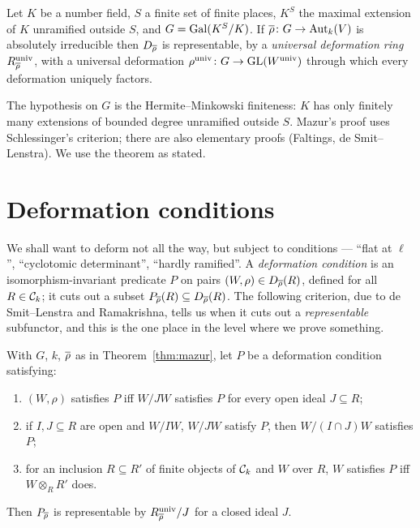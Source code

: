 \documentclass[11pt]{article}
\begin{document}
\begin{theorem}[Mazur, 1989]\label{thm:mazur}
Let $K$ be a number field, $S$ a finite set of finite places, $K^S$ the maximal
extension of $K$ unramified outside $S$, and $G=\operatorname{Gal}(K^S/K)$. If
$\overline{\rho}\colon G\to\operatorname{Aut}_k(V)$ is absolutely irreducible then $D_{\overline{\rho}}$ is
representable, by a \emph{universal deformation ring} $R^{\mathrm{univ}}_{\overline{\rho}}$, with
a universal deformation
$\rho^{\mathrm{univ}}\colon G\to\operatorname{GL}(W^{\mathrm{univ}})$ through which every deformation
uniquely factors.
\end{theorem}

The hypothesis on $G$ is the Hermite--Minkowski finiteness: $K$ has only finitely
many extensions of bounded degree unramified outside $S$. Mazur's proof uses
Schlessinger's criterion; there are also elementary proofs (Faltings, de
Smit--Lenstra). We use the theorem as stated.

\section{Deformation conditions}

We shall want to deform not all the way, but subject to conditions --- ``flat
at $\ell$'', ``cyclotomic determinant'', ``hardly ramified''. A
\emph{deformation condition} is an isomorphism-invariant predicate $P$ on pairs
$(W,\rho)\in D_{\overline{\rho}}(R)$, defined for all $R\in\mathcal{C}_k$; it cuts out a
subset $P_{\overline{\rho}}(R)\subseteq D_{\overline{\rho}}(R)$. The following criterion, due to
de Smit--Lenstra and Ramakrishna, tells us when it cuts out a
\emph{representable} subfunctor, and this is the one place in the level where we
prove something.

\begin{theorem}\label{thm:condition}
With $G$, $k$, $\overline{\rho}$ as in Theorem~\ref{thm:mazur}, let $P$ be a deformation
condition satisfying:
\begin{enumerate}
\item[\textup{(1)}] $(W,\rho)$ satisfies $P$ iff $W/JW$ satisfies $P$ for every
open ideal $J\subseteq R$;
\item[\textup{(2)}] if $I,J\subseteq R$ are open and $W/IW$, $W/JW$ satisfy
$P$, then $W/(I\cap J)W$ satisfies $P$;
\item[\textup{(3)}] for an inclusion $R\subseteq R'$ of finite objects of
$\mathcal{C}_k$ and $W$ over $R$, $W$ satisfies $P$ iff $W\otimes_R R'$ does.
\end{enumerate}
Then $P_{\overline{\rho}}$ is representable by $R^{\mathrm{univ}}_{\overline{\rho}}/J$ for a closed ideal
$J$.
\end{theorem}
\end{document}
